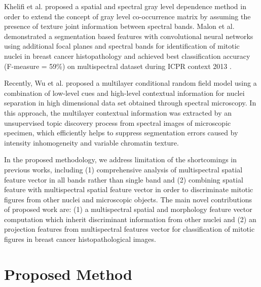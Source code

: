 \documentclass[10pt,twocolumn,letterpaper]{article}
\begin{document}
Khelifi et al. \cite{khelifi2012} proposed a spatial and spectral gray level dependence method in order to extend the concept of gray level co-occurrence matrix by assuming the presence of texture joint information between spectral bands. Malon et al. \cite{malon2013} demonstrated a segmentation based features with convolutional neural networks using additional focal planes and spectral bands for identification of mitotic nuclei in breast cancer histopathology and achieved best classification accuracy (F-measure = 59\%) on multispectral dataset during ICPR context 2013 \cite{roux2013}.

Recently, Wu et al. \cite{wu2012} proposed a multilayer conditional random field model using a combination of low-level cues and high-level contextual information for nuclei separation in high dimensional data set obtained through spectral microscopy. In this approach, the multilayer contextual information was extracted by an unsupervised topic discovery process from spectral images of microscopic specimen, which efficiently helps to suppress segmentation errors caused by intensity inhomogeneity and variable chromatin texture.

In the proposed methodology, we address limitation of the shortcomings in previous works, including (1) comprehensive analysis of multispectral spatial feature vector in all bands rather than single band \cite{masood2009,wu2009,wu2012} and (2) combining spatial feature with multispectral spatial feature vector in order to discriminate mitotic figures from other nuclei and microscopic objects. The main novel contributions of proposed work are: (1) a multispectral spatial and morphology feature vector computation which inherit discriminant information from other nuclei and (2) an projection features from multispectral features vector for classification of mitotic figures in breast cancer histopathological images.

\section{Proposed Method}
\label{sec:framework}
\end{document}
